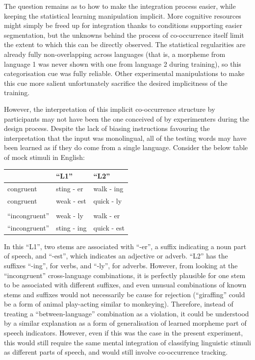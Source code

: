 The question remains as to how to make the integration process easier, while keeping the statistical learning manipulation implicit. More cognitive resources might simply be freed up for integration thanks to conditions supporting easier segmentation, but the unknowns behind the process of co-occurrence itself limit the extent to which this can be directly observed. The statistical regularities are already fully non-overlapping across languages (that is, a morpheme from language 1 was never shown with one from language 2 during training), so this categorisation cue was fully reliable. Other experimental manipulations to make this cue more salient unfortunately sacrifice the desired implicitness of the training.

However, the interpretation of this implicit co-occurrence structure by participants may not have been the one conceived of by experimenters during the design process. Despite the lack of biasing instructions favouring the interpretation that the input was monolingual, all of the testing words may have been learned as if they do come from a single language. Consider the below table of mock stimuli in English:

\begin{table}[!htbp]
    \begin{center}
        \begin{tabular}{@{}lll@{}}
            \toprule
            & \textbf{``L1''} & \textbf{``L2''} \\ \midrule
            congruent & sting - er & walk - ing \\ \midrule
            congruent & weak - est & quick - ly \\ \midrule
            & & \\ \midrule
            ``incongruent'' & weak - ly & walk - er \\ \midrule
            ``incongruent'' & sting - ing & quick - est \\ \midrule
        \end{tabular}
    \end{center}
\end{table}

In this ``L1'', two stems are associated with ``-er'', a suffix indicating a noun part of speech, and ``-est'', which indicates an adjective or adverb. ``L2'' has the suffixes ``-ing'', for verbs, and ``-ly'', for adverbs. However, from looking at the ``incongruent'' cross-language combinations, it is perfectly plausible for one stem to be associated with different suffixes, and even unusual combinations of known stems and suffixes would not necessarily be cause for rejection (``giraffing'' could be a form of animal play-acting similar to monkeying). Therefore, instead of treating a ``between-language'' combination as a violation, it could be understood by a similar explanation as a form of generalisation of learned morpheme part of speech indicators. However, even if this was the case in the present experiment, this would still require the same mental integration of classifying linguistic stimuli as different parts of speech, and would still involve co-occurrence tracking.

